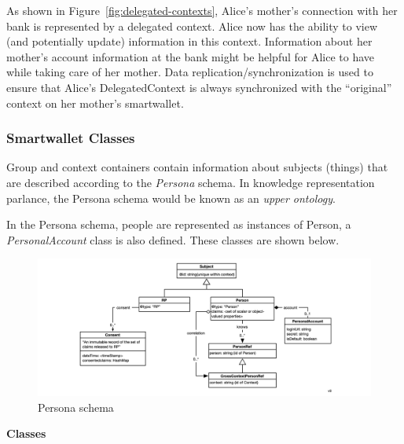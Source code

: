 \documentclass[11pt, oneside]{article}   	%
\begin{document}
As shown in Figure~\ref{fig:delegated-contexts}, Alice's mother's connection with her bank is represented by a delegated context. Alice now has the ability to view (and potentially update) information in this context. Information about her mother's account information at the bank might be helpful for Alice to have while taking care of her mother. Data replication/synchronization is used to ensure that Alice's DelegatedContext is always synchronized with the ``original'' context on her mother's smartwallet.

\subsubsection{Smartwallet Classes}

Group and context containers contain information about subjects (things) that are described according to the \emph{Persona} schema. In knowledge representation parlance, the Persona schema would be known as an \emph{upper ontology}.

In the Persona schema, people are represented as instances of Person, a \emph{PersonalAccount} class is also defined. These classes are shown below. 

\begin{figure}[htbp]
\includegraphics[width=\textwidth]{./images/persona-classes.png}
\caption{Persona schema}
\end{figure}

\textbf{Classes}
\end{document}
